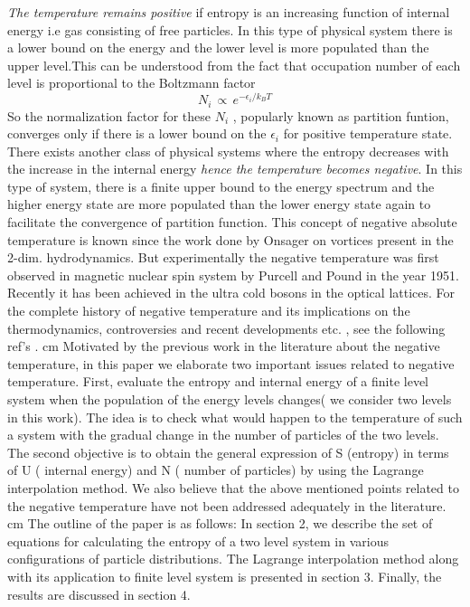 \documentclass{article}
\begin{document}
 {\it The temperature remains positive} if entropy is an increasing function of internal energy i.e gas consisting of free particles. In this type of physical system there is a lower bound on the energy  and the lower level is more populated than the upper level.This can be understood from the fact that occupation number of each level is proportional  to the Boltzmann factor 
 $$ N_i\, \propto \, e^{-\epsilon_i / k_BT} $$
 So  the normalization factor for these $N_i$ , popularly known as partition funtion,  converges only if there is a lower bound on the $\epsilon_i$  for positive temperature state.
There exists another class of physical systems  where the entropy decreases with the increase in the internal energy {\it hence the temperature becomes negative}.  In this type of system, there is a finite upper bound to the energy spectrum and the higher energy state are more populated than the lower energy state again to facilitate the convergence of partition function.
This concept of negative absolute  temperature is known since the work done by Onsager on 
vortices  present in the 2-dim.  hydrodynamics{\cite{1}}. But experimentally the negative temperature  was first observed in magnetic  nuclear spin system by Purcell and Pound in the year 1951{\cite{2}}.  Recently it has been achieved in the ultra cold bosons in the optical lattices{\cite{3}}. For the complete history of negative temperature and its implications on the thermodynamics,  controversies and recent developments etc. ,  see the following ref's {\cite{4,5,6,7,8,9,10,11,12}}.
  cm
 \noindent  Motivated by the previous work in the literature about the negative temperature, in this paper
  we elaborate two important issues related to negative temperature.
First, evaluate the entropy and internal energy of a finite level system when the   population  of the  energy levels changes( we consider two levels in this work). The idea is to check what would happen to the temperature of such a system with the  gradual change in the number of particles of the two levels. The second objective is to obtain the general expression of S (entropy) in terms of  U ( internal energy) and N ( number of particles) by using the Lagrange interpolation method. We also believe that the above mentioned points related to the negative temperature have not been addressed adequately in the literature.  cm
 \noindent The outline of the paper is as follows: In section 2, we describe the set of equations for calculating the entropy of a  two level system in various configurations of particle distributions. The Lagrange interpolation method along with its application to  finite level system is presented in section 3. Finally, the results are discussed in section 4. 
 
\end{document}

